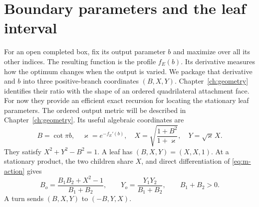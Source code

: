 \section{Boundary parameters and the leaf interval}

For an open completed box, fix its output parameter $b$ and maximize over all its other indices. The resulting function is the profile $f_E(b)$. Its derivative measures how the optimum changes when the output is varied. We package that derivative and $b$ into three positive-branch coordinates $(B,X,Y)$. Chapter~\ref{ch:geometry} identifies their ratio with the shape of an ordered quadrilateral attachment face. For now they provide an efficient exact recursion for locating the stationary leaf parameters.
The ordered output metric will be described in Chapter~\ref{ch:geometry}. Its useful algebraic coordinates are
\begin{equation}\label{eq:port-def}
 B=\cot\pi b,\quad \varkappa=e^{-f_E'(b)},\quad
 X=\sqrt{\frac{1+B^2}{1+\varkappa}},\quad Y=\sqrt{\varkappa}\,X.
\end{equation}
They satisfy $X^2+Y^2-B^2=1$. A leaf has $(B,X,Y)=(X,X,1)$. At a stationary product, the two children share $X$, and direct differentiation of \eqref{eq:m-action} gives
\begin{equation}\label{eq:port-product}
 B_o=\frac{B_1B_2+X^2-1}{B_1+B_2},\qquad
 Y_o=\frac{Y_1Y_2}{B_1+B_2},\qquad B_1+B_2>0.
\end{equation}
A turn sends $(B,X,Y)$ to $(-B,Y,X)$.

